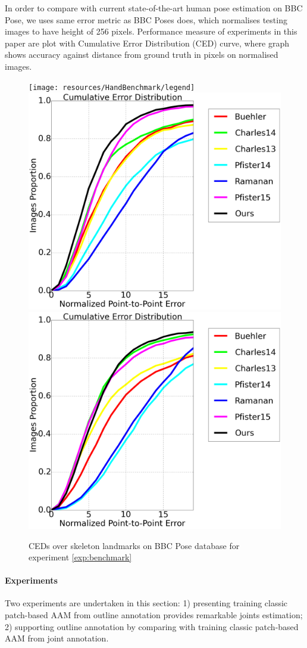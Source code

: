 In order to compare with current state-of-the-art human pose estimation on BBC Pose, we uses same error metric as BBC Poses does, which normalises testing images to have height of 256 pixels. Performance measure of experiments in this paper are plot with Cumulative Error Distribution (CED) curve, where graph shows accuracy against distance from ground truth in pixels on normalised images.


\begin{figure}[b!]
    \centering
    \texttt{[image: resources/HandBenchmark/legend]}
    \\
    \includegraphics[width=0.48\columnwidth]{resources/HandBenchmark/wrist}
    \includegraphics[width=0.48\columnwidth]{resources/HandBenchmark/elbow}
    \caption{CEDs over skeleton landmarks on BBC Pose database for experiment \ref{exp:benchmark}}
    \label{fig:hand_benchmark}
\end{figure}

\paragraph{Experiments} Two experiments are undertaken in this section: 1) presenting training classic patch-based AAM from outline annotation provides remarkable joints estimation; 2) supporting outline annotation by comparing with training classic patch-based AAM from joint annotation.

